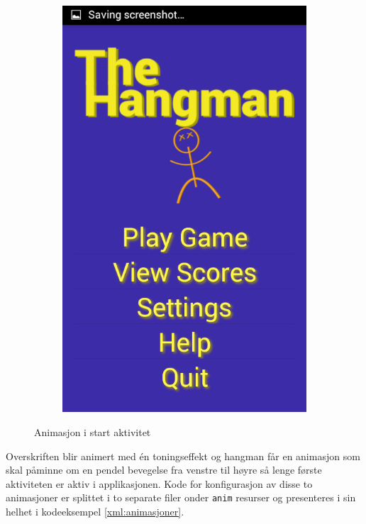 \begin{figure}[ht]
\begin{subfigure}[b]{0.25\textwidth}
        \includegraphics[width=\textwidth]{./img/gui/a3.png}
    \end{subfigure}
    \caption{Animasjon i start aktivitet}
    \label{fig:hangman_animasjon}
\end{figure}

Overskriften blir animert med én toningseffekt og hangman får en animasjon som skal påminne om en pendel bevegelse fra venstre til høyre så lenge første aktiviteten er aktiv i applikasjonen. Kode for konfigurasjon av disse to animasjoner er splittet i to separate filer onder \texttt{anim} resurser og presenteres i sin helhet i kodeeksempel \ref{xml:animasjoner}.

